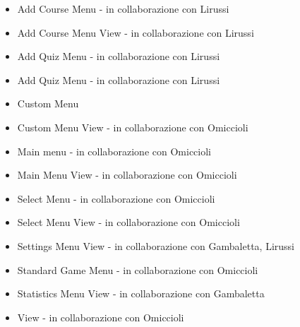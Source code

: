     \begin{itemize}
        \item Add Course Menu - in collaborazione con Lirussi
        \item Add Course Menu View - in collaborazione con Lirussi
        \item Add Quiz Menu - in collaborazione con Lirussi
        \item Add Quiz Menu - in collaborazione con Lirussi
        \item Custom Menu
        \item Custom Menu View - in collaborazione con Omiccioli
        \item Main menu - in collaborazione con Omiccioli
        \item Main Menu View - in collaborazione con Omiccioli
        \item Select Menu - in collaborazione con Omiccioli
        \item Select Menu View - in collaborazione con Omiccioli
        \item Settings Menu View - in collaborazione con Gambaletta, Lirussi
        \item Standard Game Menu - in collaborazione con Omiccioli
        \item Statistics Menu View - in collaborazione con Gambaletta
        \item View - in collaborazione con Omiccioli
    \end{itemize}

    